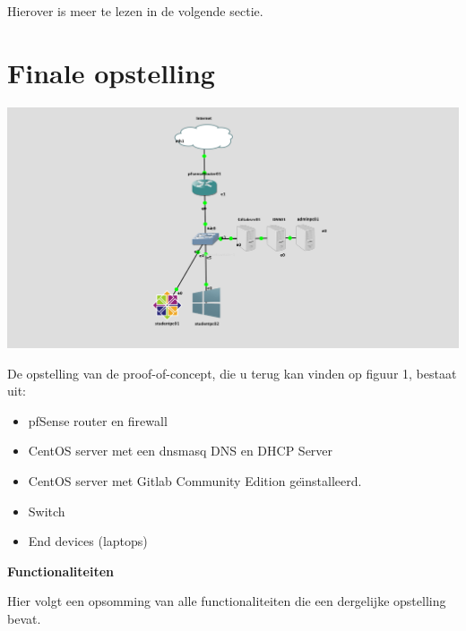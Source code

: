 \documentclass[a0,portrait]{a0poster}
\begin{document}
\begin{multicols}{2}
Hierover is meer te lezen in de volgende sectie.

\bigskip

\bigskip


\color{HoGentAccent1} 
\section*{Finale opstelling}
\color{black}

\begin{center}\vspace{1cm}
	\includegraphics[width=1.0\linewidth]{gns3FinalPoC}
	\label{1}
\end{center}\vspace{1cm}

De opstelling van de  proof-of-concept, die u terug kan vinden op figuur 1, bestaat uit:
\begin{itemize}
	\item pfSense router en firewall
	\item CentOS server met een dnsmasq DNS en DHCP Server
	\item CentOS server met Gitlab Community Edition ge\"{\i}nstalleerd.
	\item Switch
	\item End devices (laptops)
\end{itemize}
\bigskip

\textbf{Functionaliteiten}

Hier volgt een opsomming van alle functionaliteiten die een dergelijke opstelling bevat.


\end{multicols}
\end{document}
